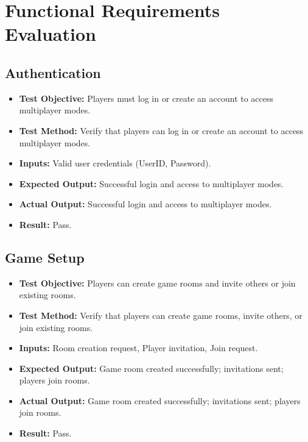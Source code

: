 \documentclass[12pt, titlepage]{article}
\begin{document}
\newpage

\tableofcontents

\listoftables %

\listoffigures %

\newpage


\section{Functional Requirements Evaluation}

\subsection{Authentication}
\begin{itemize}
    \item \textbf{Test Objective:} Players must log in or create an account to access multiplayer modes.
    \item \textbf{Test Method:} Verify that players can log in or create an account to access multiplayer modes.
    \item \textbf{Inputs:} Valid user credentials (UserID, Password).
    \item \textbf{Expected Output:} Successful login and access to multiplayer modes.
    \item \textbf{Actual Output:} Successful login and access to multiplayer modes.
    \item \textbf{Result:} Pass.
\end{itemize}

\subsection{Game Setup}
\begin{itemize}
    \item \textbf{Test Objective:} Players can create game rooms and invite others or join existing rooms.
    \item \textbf{Test Method:} Verify that players can create game rooms, invite others, or join existing rooms.
    \item \textbf{Inputs:} Room creation request, Player invitation, Join request.
    \item \textbf{Expected Output:} Game room created successfully; invitations sent; players join rooms.
    \item \textbf{Actual Output:} Game room created successfully; invitations sent; players join rooms.
    \item \textbf{Result:} Pass.
\end{itemize}
\end{document}
